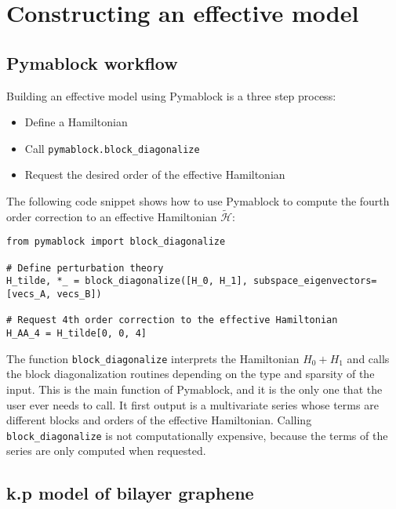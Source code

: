 \section{Constructing an effective model}
\subsection{Pymablock workflow}

Building an effective model using Pymablock is a three step process:
%
\begin{itemize}
\item Define a Hamiltonian
\item Call \texttt{pymablock.block\_diagonalize}
\item Request the desired order of the effective Hamiltonian
\end{itemize}
%
The following code snippet shows how to use Pymablock to compute the fourth
order correction to an effective Hamiltonian $\tilde{\mathcal{H}}$:
%
\begin{verbatim}
from pymablock import block_diagonalize

# Define perturbation theory
H_tilde, *_ = block_diagonalize([H_0, H_1], subspace_eigenvectors=[vecs_A, vecs_B])

# Request 4th order correction to the effective Hamiltonian
H_AA_4 = H_tilde[0, 0, 4]
\end{verbatim}


The function \texttt{block\_diagonalize} interprets the Hamiltonian $H_0 +
H_1$ and calls the block diagonalization routines depending on the
type and sparsity of the input.
This is the main function of Pymablock, and it is the only one that the user
ever needs to call.
It first output is a multivariate series whose terms are different blocks and
orders of the effective Hamiltonian.
Calling \texttt{block\_diagonalize} is not computationally expensive, because the
terms of the series are only computed when requested.

\subsection{k.p model of bilayer graphene}

